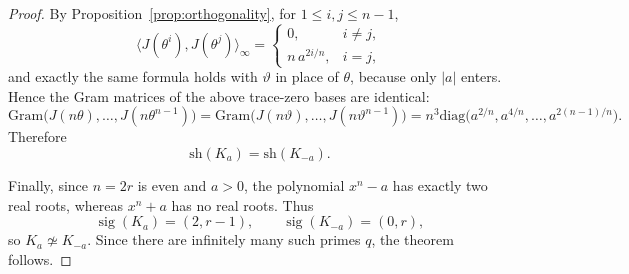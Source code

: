 \documentclass[10pt,a4paper]{amsart}
\newcommand{\diag}{\mathrm{diag}}
\newcommand{\sh}{\mathrm{sh}}
\begin{document}
\begin{proof}
By Proposition~\ref{prop:orthogonality}, for \(1\le i,j\le n-1\),
\[
\bigl\langle J(\theta^i),J(\theta^j)\bigr\rangle_\infty
=
\begin{cases}
0,& i\neq j,\\[2mm]
n\,a^{2i/n},& i=j,
\end{cases}
\]
and exactly the same formula holds with \(\vartheta\) in place of \(\theta\), because only \(|a|\)
enters. Hence the Gram matrices of the above trace-zero bases are identical:
\[
\mathrm{Gram}\bigl(J(n\theta),\dots,J(n\theta^{n-1})\bigr)
=
\mathrm{Gram}\bigl(J(n\vartheta),\dots,J(n\vartheta^{n-1})\bigr)
=
n^3\diag\!\bigl(a^{2/n},a^{4/n},\dots,a^{2(n-1)/n}\bigr).
\]
Therefore
\[
\sh(K_a)=\sh(K_{-a}).
\]

Finally, since \(n=2r\) is even and \(a>0\), the polynomial \(x^n-a\) has exactly two real roots,
whereas \(x^n+a\) has no real roots. Thus
\[
\operatorname{sig}(K_a)=(2,r-1),
\qquad
\operatorname{sig}(K_{-a})=(0,r),
\]
so \(K_a\not\simeq K_{-a}\).
Since there are infinitely many such primes \(q\), the theorem follows.
\end{proof}
\end{document}
